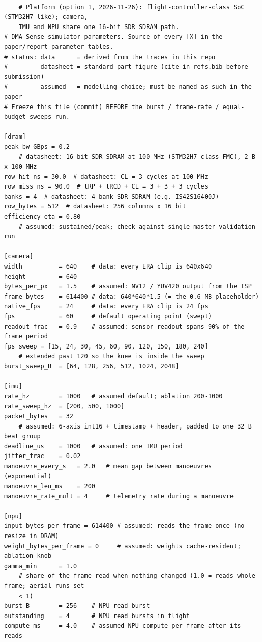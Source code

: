 {\scriptsize
\begin{verbatim}

    # Platform (option 1, 2026-11-26): flight-controller-class SoC (STM32H7-like); camera,
    IMU and NPU share one 16-bit SDR SDRAM path.
# DMA-Sense simulator parameters. Source of every [X] in the paper/report parameter tables.
# status: data      = derived from the traces in this repo
#         datasheet = standard part figure (cite in refs.bib before submission)
#         assumed   = modelling choice; must be named as such in the paper
# Freeze this file (commit) BEFORE the burst / frame-rate / equal-budget sweeps run.

[dram]
peak_bw_GBps = 0.2
    # datasheet: 16-bit SDR SDRAM at 100 MHz (STM32H7-class FMC), 2 B x 100 MHz
row_hit_ns = 30.0  # datasheet: CL = 3 cycles at 100 MHz
row_miss_ns = 90.0  # tRP + tRCD + CL = 3 + 3 + 3 cycles
banks = 4  # datasheet: 4-bank SDR SDRAM (e.g. IS42S16400J)
row_bytes = 512  # datasheet: 256 columns x 16 bit
efficiency_eta = 0.80
    # assumed: sustained/peak; check against single-master validation run

[camera]
width          = 640    # data: every ERA clip is 640x640
height         = 640
bytes_per_px   = 1.5    # assumed: NV12 / YUV420 output from the ISP
frame_bytes    = 614400 # data: 640*640*1.5 (= the 0.6 MB placeholder)
native_fps     = 24     # data: every ERA clip is 24 fps
fps            = 60     # default operating point (swept)
readout_frac   = 0.9    # assumed: sensor readout spans 90% of the frame period
fps_sweep = [15, 24, 30, 45, 60, 90, 120, 150, 180, 240]
    # extended past 120 so the knee is inside the sweep
burst_sweep_B  = [64, 128, 256, 512, 1024, 2048]

[imu]
rate_hz        = 1000   # assumed default; ablation 200-1000
rate_sweep_hz  = [200, 500, 1000]
packet_bytes   = 32
    # assumed: 6-axis int16 + timestamp + header, padded to one 32 B beat group
deadline_us    = 1000   # assumed: one IMU period
jitter_frac    = 0.02
manoeuvre_every_s   = 2.0   # mean gap between manoeuvres (exponential)
manoeuvre_len_ms    = 200
manoeuvre_rate_mult = 4     # telemetry rate during a manoeuvre

[npu]
input_bytes_per_frame = 614400 # assumed: reads the frame once (no resize in DRAM)
weight_bytes_per_frame = 0     # assumed: weights cache-resident; ablation knob
gamma_min      = 1.0
    # share of the frame read when nothing changed (1.0 = reads whole frame; aerial runs set
    < 1)
burst_B        = 256    # NPU read burst
outstanding    = 4      # NPU read bursts in flight
compute_ms     = 4.0    # assumed NPU compute per frame after its reads


\end{verbatim}}
